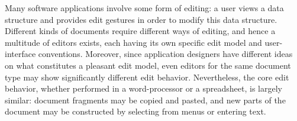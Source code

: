 \documentclass{entcs}
\begin{document}
\newcommand{\editScrshot}[3]{\fbox{%
\parbox{#1mm}{
\begin{center} #2\\
{\vspace{3mm}\small #3}
\end{center}
}}}
\newcommand{\thenn}{\hspace{1mm}$\Rightarrow$\hspace{1mm}}


\newcommand{\editStepScrshot}[4]{%
\begin{center}
\hspace{\stretch{1}}\fbox{
\begin{tabular}[c]{@{}c@{}} \\ [-3mm]
#1 \\ [1mm]
\end{tabular}
}
\thenn
\fbox{
\begin{tabular}[c]{@{}c@{}} \\ [-3mm]
#2 \\ [1mm]
\end{tabular}
} \hspace*{\stretch{1}} \nopagebreak[4] \\ [3mm]
\nopagebreak[4] \hspace*{#3}{#4}\\
\end{center}}

\newcommand{\editStepScrshotChk}[4]{%
\editStepScrshot{#1}{#2}{#3}{#4}
\begin{center}
$\Rightarrow$\\
{#4}
\end{center}
}

\newcommand{\editStepScrshotSz}[5]{%
\editStepScrshot{\parbox{#1}{#2}}{\parbox{#1}{#3}}{#4}{#5}
}

Many software applications involve some form of editing: a user views a data structure and provides edit gestures in order to modify this data structure. Different kinds of documents require different ways of editing, and hence a multitude of editors exists, each having its own specific edit model and user-interface conventions. Moreover, since application designers have different ideas on what constitutes a pleasant edit model, even editors for the same document type may show significantly different edit behavior. Nevertheless, the core edit behavior, whether performed in a word-processor or a spreadsheet, is largely similar: document fragments may be copied and pasted, and new parts of the document may be constructed by selecting from menus or entering text. 
\end{document}
